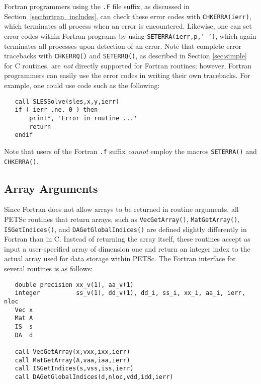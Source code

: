 Fortran programmers using the {\tt .F} file suffix, as discussed in
Section~\ref{sec:fortran_includes}, can check these error codes with
{\tt CHKERRA(ierr)}, which terminates all process when an error is
encountered.  Likewise, one can set error codes within Fortran programs by
using {\tt SETERRA(ierr,p,' ')}, which again terminates all processes
upon detection of an error.  
Note that complete error tracebacks with
{\tt CHKERRQ()} and {\tt SETERRQ()}, as described in Section
\ref{sec:simple} for C routines, are {\em not} directly supported for
Fortran routines; however, Fortran programmers can easily use the
error codes in writing their own tracebacks.  For example, one could
use code such as the following:
\begin{verbatim}
   call SLESSolve(sles,x,y,ierr)
   if ( ierr .ne. 0 ) then
       print*, 'Error in routine ...'
       return
   endif
\end{verbatim}
Note that users of the Fortran {\tt .f} suffix {\em cannot} employ the
macros {\tt SETERRA()} and {\tt CHKERRA()}.

\subsection{Array Arguments}
\label{sec:fortran_arrays}

Since Fortran does not allow arrays to be returned in routine
arguments, all PETSc routines that return arrays, such as 
{\tt VecGetArray()}, {\tt MatGetArray()}, 
{\tt ISGetIndices()}, and {\tt DAGetGlobalIndices()}
are defined slightly differently in Fortran than in C.  
  
 
Instead of returning the array itself, these routines
accept as input a user-specified array of dimension one and return an
integer index to the actual array used for data storage within PETSc.
The Fortran interface for several routines is as follows:
\begin{verbatim}
   double precision xx_v(1), aa_v(1)
   integer          ss_v(1), dd_v(1), dd_i, ss_i, xx_i, aa_i, ierr, nloc
   Vec x
   Mat A
   IS  s
   DA  d

   call VecGetArray(x,vxx,ixx,ierr)
   call MatGetArray(A,vaa,iaa,ierr)
   call ISGetIndices(s,vss,iss,ierr)
   call DAGetGlobalIndices(d,nloc,vdd,idd,ierr)
\end{verbatim}

